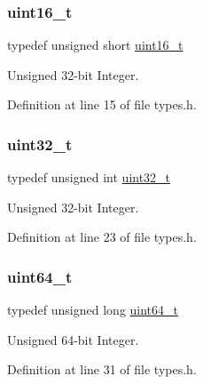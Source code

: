\subsubsection{\texorpdfstring{uint16\+\_\+t}{uint16\_t}}
{\footnotesize\ttfamily typedef unsigned short \hyperlink{a00032_a273cf69d639a59973b6019625df33e30_a273cf69d639a59973b6019625df33e30}{uint16\+\_\+t}}



Unsigned 32-\/bit Integer. 



Definition at line 15 of file types.\+h.

\mbox{\label{a00032_a435d1572bf3f880d55459d9805097f62_a435d1572bf3f880d55459d9805097f62}} 
\subsubsection{\texorpdfstring{uint32\+\_\+t}{uint32\_t}}
{\footnotesize\ttfamily typedef unsigned int \hyperlink{a00032_a435d1572bf3f880d55459d9805097f62_a435d1572bf3f880d55459d9805097f62}{uint32\+\_\+t}}



Unsigned 32-\/bit Integer. 



Definition at line 23 of file types.\+h.

\mbox{\label{a00032_aa232ecf786a74ce5363c36c10798d2b1_aa232ecf786a74ce5363c36c10798d2b1}} 
\subsubsection{\texorpdfstring{uint64\+\_\+t}{uint64\_t}}
{\footnotesize\ttfamily typedef unsigned long \hyperlink{a00032_aa232ecf786a74ce5363c36c10798d2b1_aa232ecf786a74ce5363c36c10798d2b1}{uint64\+\_\+t}}



Unsigned 64-\/bit Integer. 



Definition at line 31 of file types.\+h.

\mbox{\label{a00032_aba7bc1797add20fe3efdf37ced1182c5_aba7bc1797add20fe3efdf37ced1182c5}} 
